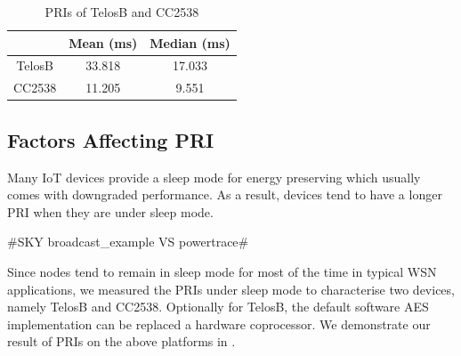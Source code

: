 \begin{table}[ht!]
	\centering
	{
		\begin{tabular}{|c|c|c|}
			\hline
			              & Mean (ms)     & Median (ms)   \\ \hline
			TelosB & 33.818 & 17.033 \\ \hline
			CC2538 & 11.205  & 9.551 \\ \hline
		\end{tabular}
	}
	\caption{PRIs of TelosB and CC2538}
	\label{PRI_SkyCC2538}
\end{table}


\subsection{Factors Affecting PRI} \label{PingDevice}

Many IoT devices provide a sleep mode for energy preserving which usually comes with downgraded performance. As a result, devices tend to have a longer PRI when they are under sleep mode. 

\#SKY broadcast\_example VS powertrace\#

Since nodes tend to remain in sleep mode for most of the time in typical WSN applications, we measured the PRIs under sleep mode to characterise two devices, namely TelosB\cite{TelosB} and CC2538\cite{CC2538}. Optionally for TelosB, the default software AES implementation can be replaced a hardware coprocessor. We demonstrate our result of PRIs on the above platforms in .

